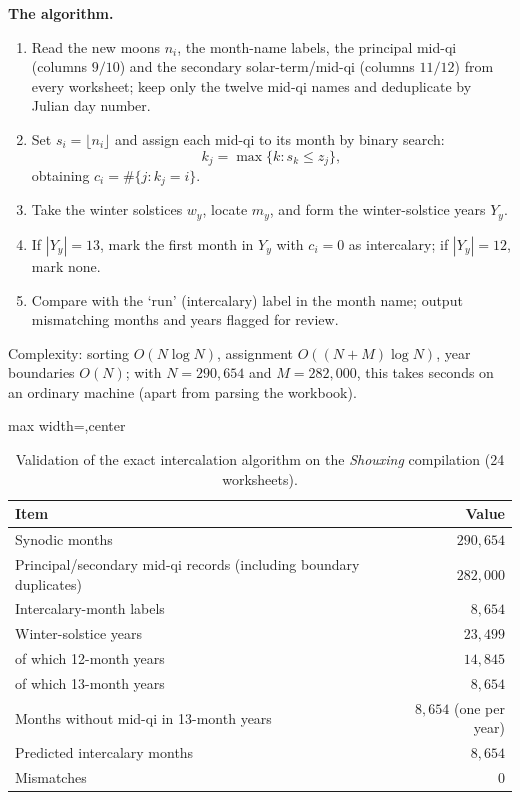 \textbf{The algorithm.}

\begin{enumerate}[label=\textbf{Step \arabic*.}, leftmargin=*]
    \item Read the new moons \(n_i\), the month-name labels, the principal mid-qi (columns \(9/10\)) and the secondary solar-term/mid-qi (columns \(11/12\)) from every worksheet; keep only the twelve mid-qi names and deduplicate by Julian day number.
    \item Set \(s_i=\lfloor n_i\rfloor\) and assign each mid-qi to its month by binary search:
    \[
    k_j=\max\{k: s_k\le z_j\},
    \]
    obtaining \(c_i=\#\{j:k_j=i\}\).
    \item Take the winter solstices \(w_y\), locate \(m_y\), and form the winter-solstice years \(Y_y\).
    \item If \(|Y_y|=13\), mark the first month in \(Y_y\) with \(c_i=0\) as intercalary; if \(|Y_y|=12\), mark none.
    \item Compare with the `run' (intercalary) label in the month name; output mismatching months and years flagged for review.
\end{enumerate}

Complexity: sorting \(O(N\log N)\), assignment \(O((N+M)\log N)\), year boundaries \(O(N)\); with \(N=290{,}654\) and \(M=282{,}000\), this takes seconds on an ordinary machine (apart from parsing the workbook).

\begin{table}[htbp]
\centering
\caption{Validation of the exact intercalation algorithm on the \textit{Shouxing} compilation (24 worksheets).}
\label{tab:exact_intercalation_validation}
\begin{adjustbox}{max width=\linewidth,center}
\begin{tabular}{lr}
\toprule
Item & Value \\
\midrule
Synodic months & \(290{,}654\) \\
Principal/\allowbreak secondary mid-qi records (including boundary duplicates) & \(282{,}000\) \\
Intercalary-month labels & \(8{,}654\) \\
Winter-solstice years & \(23{,}499\) \\
of which 12-month years & \(14{,}845\) \\
of which 13-month years & \(8{,}654\) \\
Months without mid-qi in 13-month years & \(8{,}654\) (one per year) \\
Predicted intercalary months & \(8{,}654\) \\
Mismatches & \(0\) \\
\bottomrule
\end{tabular}
\end{adjustbox}
\end{table}

